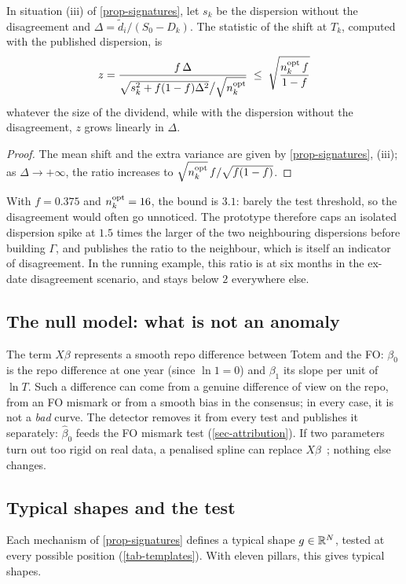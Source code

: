 \begin{proposition}[Masking]\label{prop-masking}
In situation (iii) of \cref{prop-signatures}, let $s_k$ be the dispersion without the disagreement and
$\Delta=\tilde d_i/(S_0-D_k)$. The statistic of the shift at $T_k$, computed with the published dispersion, is
\[
z=\frac{f\,\Delta}{\sqrt{s_k^2+f(1-f)\Delta^2}\big/\sqrt{n^{\mathrm{opt}}_k}}\;\le\;\sqrt{\frac{n^{\mathrm{opt}}_k\,f}{1-f}}
\]
whatever the size of the dividend, while with the dispersion without the disagreement, $z$ grows linearly in $\Delta$.
\end{proposition}
\begin{proof}
The mean shift and the extra variance are given by \cref{prop-signatures}, (iii); as $\Delta\to+\infty$, the ratio
increases to $\sqrt{n^{\mathrm{opt}}_k}\,f/\sqrt{f(1-f)}$.
\end{proof}
With $f=\num{0.375}$ and $n^{\mathrm{opt}}_k=16$, the bound is $\num{3.1}$: barely the test threshold, so the disagreement would
often go unnoticed. The prototype therefore caps an isolated dispersion spike at $\num{1.5}$ times the larger of the
two neighbouring dispersions before building $\Gamma$, and publishes the ratio to the neighbour, which is itself an
indicator of disagreement. In the running example, this ratio is \vRunTimingRatio{} at six months in the ex-date
disagreement scenario, and stays below $2$ everywhere else.

\subsection{The null model: what is not an anomaly}\label{sec-null}
The term $X\beta$ represents a smooth repo difference between Totem and the FO: $\beta_0$ is the repo difference at one
year (since $\ln1=0$) and $\beta_1$ its slope per unit of $\ln T$. Such a difference can come from a genuine difference
of view on the repo, from an FO mismark or from a smooth bias in the consensus; in every case, it is not a \emph{bad}
curve. The detector removes it from every test and publishes it separately: $\hat\beta_0$ feeds the FO mismark test
(\cref{sec-attribution}). If two parameters turn out too rigid on real data, a penalised spline can replace
$X\beta$~\cite{eilers1996}; nothing else changes.

\subsection{Typical shapes and the test}\label{sec-test}
Each mechanism of \cref{prop-signatures} defines a typical shape $g\in\mathbb{R}^N$, tested at every possible position
(\cref{tab-templates}). With eleven pillars, this gives \vNTemplates{} typical shapes.

